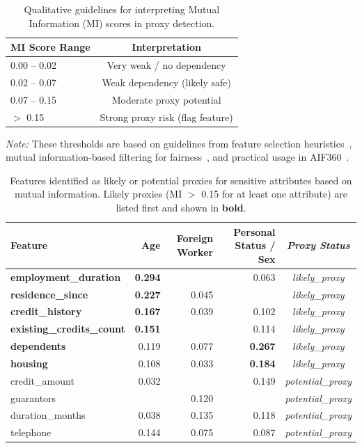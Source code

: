 \begin{table}[h]
\centering
\caption{Qualitative guidelines for interpreting Mutual Information (MI) scores in proxy detection.}
\label{tab:mi_thresholds}
\begin{tabular}{lc}
\toprule
\textbf{MI Score Range} & \textbf{Interpretation} \\
\midrule
0.00 -- 0.02   & Very weak / no dependency \\
0.02 -- 0.07   & Weak dependency (likely safe) \\
0.07 -- 0.15   & Moderate proxy potential \\
$>$ 0.15       & Strong proxy risk (flag feature) \\
\bottomrule
\end{tabular}

\vspace{0.5em}
\small
\textit{Note:} These thresholds are based on guidelines from feature selection heuristics~\cite{peng2005feature}, mutual information-based filtering for fairness~\cite{calmon2017optimized}, and practical usage in AIF360~\cite{bellamy2019aif360}.
\end{table}

\begin{table}[ht]
\small
\centering
\caption{Features identified as likely or potential proxies for sensitive attributes based on mutual information. Likely proxies (MI $>$ 0.15 for at least one attribute) are listed first and shown in \textbf{bold}.}
\label{tab:sorted_mi_proxies}
\begin{tabular}{lrrr>{\itshape}c}
\toprule
\textbf{Feature} & \textbf{Age} & \textbf{Foreign Worker} & \textbf{Personal Status / Sex} & \textbf{Proxy Status} \\
\midrule
\textbf{employment\_duration}     & \textbf{0.294} &         & 0.063 & likely\_proxy \\
\textbf{residence\_since}         & \textbf{0.227} & 0.045   &       & likely\_proxy \\
\textbf{credit\_history}          & \textbf{0.167} & 0.039   & 0.102 & likely\_proxy \\
\textbf{existing\_credits\_count} & \textbf{0.151} &         & 0.114 & likely\_proxy \\
\textbf{dependents}               & 0.119          & 0.077   & \textbf{0.267} & likely\_proxy \\
\textbf{housing}                  & 0.108          & 0.033   & \textbf{0.184} & likely\_proxy \\
credit\_amount                    & 0.032          &         & 0.149 & potential\_proxy \\
guarantors                        &                & 0.120   &       & potential\_proxy \\
duration\_months                  & 0.038          & 0.135   & 0.118 & potential\_proxy \\
telephone                         & 0.144          & 0.075   & 0.087 & potential\_proxy \\
\bottomrule
\end{tabular}
\end{table}



